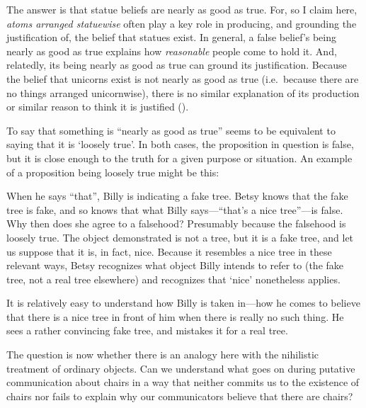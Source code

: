 \documentclass[11pt]{standalone} \newif\ifstandlone \standalonetrue
\newenvironment{squote}{%
\begin{spacing}{1}
       	\begin{list}{}{%
\setlength{\labelwidth}{0pt}%
\rightmargin\leftmargin%
}
\item\relax
}{%
\end{list}%
\end{spacing}
}
\begin{document}
\begin{spacing}{1.25}
\begin{squote}
The answer is that statue beliefs are nearly as good as true.  For, so
I claim here, {\em atoms arranged statuewise} often play a key role in
producing, and grounding the justification of, the belief that statues
exist.  In general, a false belief's being nearly as good as true
explains how {\em reasonable} people come to hold it.  And, relatedly,
its being nearly as good as true can ground its justification.
Because the belief that unicorns exist is not nearly as good as true
(i.e.\ because there are no things arranged unicornwise), there is no
similar explanation of its production or similar reason to think it is
justified (\citeyear[171--172]{merricks2001}).
\end{squote}

To say that something is ``nearly as good as true'' seems to be
equivalent to saying that it is `loosely true'.  In both cases, the
proposition in question is false, but it is close enough to the truth
for a given purpose or situation.  An example of a proposition being
loosely true might be this:






When he says ``that'', Billy is indicating a fake tree.  Betsy knows
that the fake tree is fake, and so knows that what Billy
says---``that's a nice tree''---is false.  Why then does she agree to
a falsehood?  Presumably because the falsehood is loosely true.  The
object demonstrated is not a tree, but it is a fake tree, and let us
suppose that it is, in fact, nice.  Because it resembles a nice tree
in these relevant ways, Betsy recognizes what object Billy intends to
refer to (the fake tree, not a real tree elsewhere) and recognizes
that `nice' nonetheless applies.

It is relatively easy to understand how Billy is taken in---how he
comes to believe that there is a nice tree in front of him when there
is really no such thing.  He sees a rather convincing fake tree, and
mistakes it for a real tree.

The question is now whether there is an analogy here with the
nihilistic treatment of ordinary objects.  Can we understand what goes
on during putative communication about chairs in a way that neither
commits us to the existence of chairs nor fails to explain why our
communicators believe that there are chairs?


\end{spacing}
\end{document}
